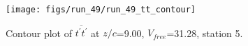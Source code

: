 \begin{figure}[H]
\centering
\texttt{[image: figs/run\_49/run\_49\_tt\_contour]}
\caption{Contour plot of $\overline{t^\prime t^\prime}$ at $z/c$=9.00, $V_{free}$=31.28, station 5.}
\end{figure}


